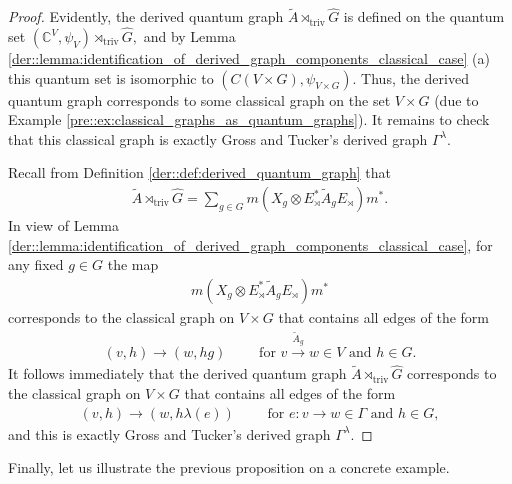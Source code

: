 \documentclass{amsart}
\newcommand{\C}{\mathbb{C}}
\theoremstyle{definition}
\theoremstyle{definition}
\begin{document}
\begin{proof}
    Evidently, the derived quantum graph $\tilde{A} \rtimes_{\mathrm{triv}} \hat{G}$ is defined on the quantum set 
    $
        (\C^V, \psi_V) \rtimes_{\mathrm{triv}} \hat{G},
    $
    and by Lemma \ref{der::lemma:identification_of_derived_graph_components_classical_case} (a) this quantum set is isomorphic to $(C(V \times G), \psi_{V \times G})$. Thus, the derived quantum graph corresponds to some classical graph on the set $V \times G$ (due to Example \ref{pre::ex:classical_graphs_as_quantum_graphs}). It remains to check that this classical graph is exactly Gross and Tucker's derived graph $\Gamma^\lambda$.

    Recall from Definition \ref{der::def:derived_quantum_graph} that
    \begin{align*}
        \tilde{A} \rtimes_{\mathrm{triv}} \hat{G} = \sum_{g \in G} m\left( X_g \otimes E_\rtimes^\ast \tilde{A}_g E_\rtimes \right) m^\ast.
    \end{align*}
    In view of Lemma \ref{der::lemma:identification_of_derived_graph_components_classical_case}, for any fixed $g \in G$ the map
    \begin{align*}
        m\left( X_g \otimes E_\rtimes^\ast \tilde{A}_g E_\rtimes \right) m^\ast
    \end{align*}
    corresponds to the classical graph on $V \times G$ that contains all edges of the form
    \begin{align*}
        (v, h) \to (w, hg)
        \qquad
        \text{ for } v \overset{\tilde{A}_g}{\longrightarrow} w \in V \text{ and } h \in G.
    \end{align*}
    It follows immediately that the derived quantum graph $\tilde{A} \rtimes_{\mathrm{triv}} \hat{G}$ corresponds to the classical graph on $V \times G$ that contains all edges of the form
    \begin{align*}
        (v, h) \to (w, h \lambda(e))
        \qquad
        \text{ for } e: v \to w \in \Gamma \text{ and } h \in G,
    \end{align*}
    and this is exactly Gross and Tucker's derived graph $\Gamma^\lambda$.
\end{proof}

Finally, let us illustrate the previous proposition on a concrete example.
\end{document}
